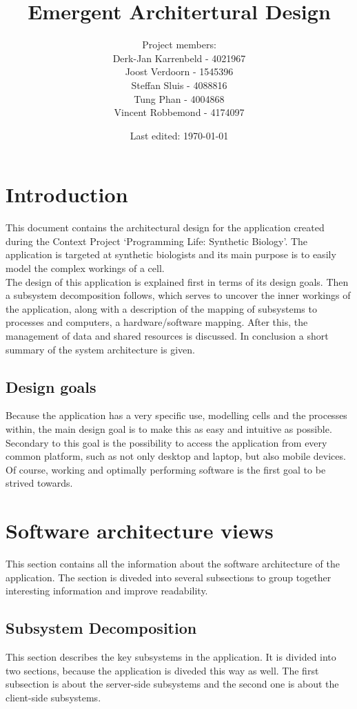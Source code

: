 \documentclass{report}
\title{Emergent Architertural Design}
\date{Last edited: \today}
\author{Project members: \\
	Derk-Jan Karrenbeld - 4021967\\
	Joost Verdoorn - 1545396\\
	Steffan Sluis - 4088816\\
	Tung Phan - 4004868\\
	Vincent Robbemond - 4174097
	}
\begin{document}
	\maketitle

	\tableofcontents

	\clearpage

	\setcounter{section}{0}
	\renewcommand*\thesection{\arabic{section}}
	
	\section{Introduction}
		This document contains the architectural design for the application created during the Context Project `Programming Life: Synthetic Biology'. The application is targeted at synthetic biologists and its main purpose is to easily model the complex workings of a cell. \\
		The design of this application is explained first in terms of its design goals. Then a subsystem decomposition follows, which serves to uncover the inner workings of the application, along with a description of the mapping of subsystems to processes and computers, a hardware/software mapping. After this, the management of data and shared resources is discussed. In conclusion a short summary of the system architecture is given.
		\subsection{Design goals}
			Because the application has a very specific use, modelling cells and the processes within, the main design goal is to make this as easy and intuitive as possible. Secondary to this goal is the possibility to access the application from every common platform, such as not only desktop and laptop, but also mobile devices. Of course, working and optimally performing software is the first goal to be strived towards.
	\clearpage
	\section{Software architecture views}
		This section contains all the information about the software architecture of the application. The section is diveded into several subsections to group together interesting information and improve readability.
		\subsection{Subsystem Decomposition}
			This section describes the key subsystems in the application. It is divided into two sections, because the application is diveded this way as well. The first subsection is about the server-side subsystems and the second one is about the client-side subsystems.
\end{document}
